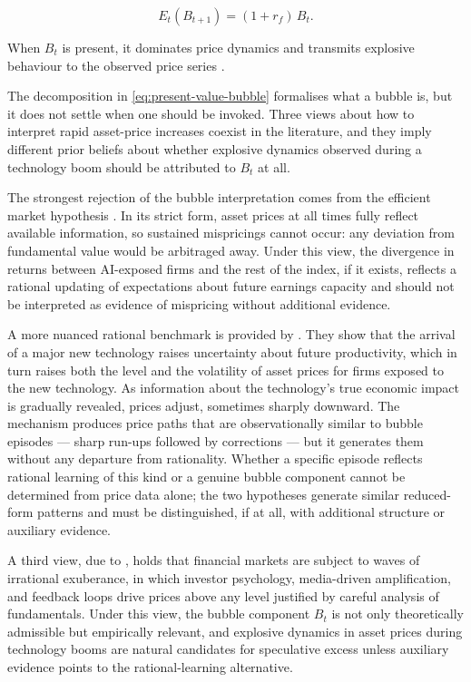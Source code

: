 \begin{equation}
E_t(B_{t+1}) = (1+r_f)\, B_t.
\label{eq:bubble-submartingale}
\end{equation}

\noindent When $B_t$ is present, it dominates price dynamics and transmits explosive behaviour to the observed price series \citep{phillipsShiYu2015a}.

The decomposition in \cref{eq:present-value-bubble} formalises what a bubble is, but it does not settle when one should be invoked. Three views about how to interpret rapid asset-price increases coexist in the literature, and they imply different prior beliefs about whether explosive dynamics observed during a technology boom should be attributed to $B_t$ at all.

The strongest rejection of the bubble interpretation comes from the efficient market hypothesis \citep{fama1970}. In its strict form, asset prices at all times fully reflect available information, so sustained mispricings cannot occur: any deviation from fundamental value would be arbitraged away. Under this view, the divergence in returns between AI-exposed firms and the rest of the index, if it exists, reflects a rational updating of expectations about future earnings capacity and should not be interpreted as evidence of mispricing without additional evidence.

A more nuanced rational benchmark is provided by \citet{pastorVeronesi2009}. They show that the arrival of a major new technology raises uncertainty about future productivity, which in turn raises both the level and the volatility of asset prices for firms exposed to the new technology. As information about the technology's true economic impact is gradually revealed, prices adjust, sometimes sharply downward. The mechanism produces price paths that are observationally similar to bubble episodes --- sharp run-ups followed by corrections --- but it generates them without any departure from rationality. Whether a specific episode reflects rational learning of this kind or a genuine bubble component cannot be determined from price data alone; the two hypotheses generate similar reduced-form patterns and must be distinguished, if at all, with additional structure or auxiliary evidence.

A third view, due to \citet{shiller2000}, holds that financial markets are subject to waves of irrational exuberance, in which investor psychology, media-driven amplification, and feedback loops drive prices above any level justified by careful analysis of fundamentals. Under this view, the bubble component $B_t$ is not only theoretically admissible but empirically relevant, and explosive dynamics in asset prices during technology booms are natural candidates for speculative excess unless auxiliary evidence points to the rational-learning alternative.

